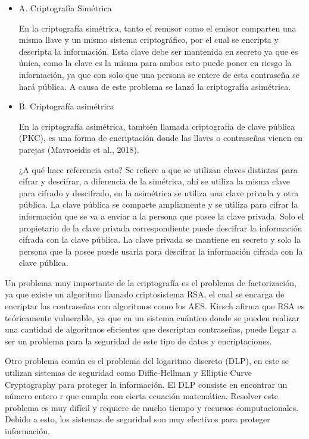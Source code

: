\documentclass[twoside]{article}
\begin{document}
\begin{itemize}
    \item{A}. Criptografía Simétrica

        En la criptografía simétrica, tanto el remisor como el emisor comparten una misma llave y un mismo sistema criptográfico, por el cual se encripta y descripta la información. Esta clave debe ser mantenida en secreto ya que es única, como la clave es la misma para ambos esto puede poner en riesgo la información, ya que con solo que una persona se entere de esta contraseña se hará pública. A causa de este problema se lanzó la criptografía asimétrica. 
    \item{B}. Criptografía asimétrica

        En la criptografía asimétrica, también llamada criptografía de clave pública (PKC), es una forma de encriptación donde las llaves o contraseñas vienen en parejas (Mavroeidis et al., 2018). 

        ¿A qué hace referencia esto? Se refiere a que se utilizan claves distintas para cifrar y descifrar, a diferencia de la simétrica, ahí se utiliza la misma clave para cifrado y descifrado, en la asimétrica se utiliza una clave privada y otra pública. La clave pública se comparte ampliamente y se utiliza para cifrar la información que se va a enviar a la persona que posee la clave privada. Solo el propietario de la clave privada correspondiente puede descifrar la información cifrada con la clave pública. La clave privada se mantiene en secreto y solo la persona que la posee puede usarla para descifrar la información cifrada con la clave pública. 
\end{itemize}

Un problema muy importante de la criptografía es el problema de factorización, ya que existe un algoritmo llamado criptosistema RSA, el cual se encarga de encriptar las contraseñas con algoritmos como los AES. Kirsch afirma que RSA es teóricamente vulnerable, ya que en un sistema cuántico donde se pueden realizar una cantidad de algoritmos eficientes que descriptan contraseñas, puede llegar a ser un problema para la seguridad de este tipo de datos y encriptaciones. 

Otro problema común es el problema del logaritmo discreto (DLP), en este se utilizan sistemas de seguridad como Diffie-Hellman y Elliptic Curve Cryptography para proteger la información. El DLP consiste en encontrar un número entero r que cumpla con cierta ecuación matemática. Resolver este problema es muy difícil y requiere de mucho tiempo y recursos computacionales. Debido a esto, los sistemas de seguridad son muy efectivos para proteger información. 
\end{document}
